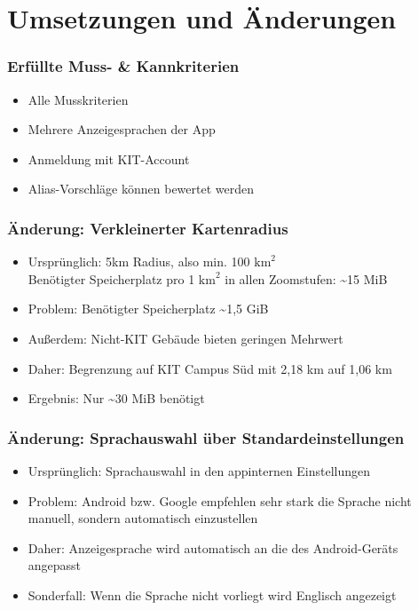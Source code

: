 \section{Umsetzungen und Änderungen}

\begin{frame}\frametitle{Erfüllte Muss- \& Kannkriterien}
    \begin{itemize}
        \item Alle Musskriterien
        \item Mehrere Anzeigesprachen der App
        \item Anmeldung mit KIT-Account
        \item Alias-Vorschläge können bewertet werden
    \end{itemize}
\end{frame}

\begin{frame}\frametitle{Änderung: Verkleinerter Kartenradius}
    \begin{itemize}
        \item Ursprünglich: 5km Radius, also min. 100 $\text{km}^2$ \\
            Benötigter Speicherplatz pro 1 $\text{km}^2$  in allen Zoomstufen: \textasciitilde15 MiB
        \item Problem: Benötigter Speicherplatz \textasciitilde1,5 GiB
        \item Außerdem: Nicht-KIT Gebäude bieten geringen Mehrwert
        \item Daher: Begrenzung auf KIT Campus Süd mit 2,18 km auf 1,06 km
        \item Ergebnis: Nur \textasciitilde30 MiB benötigt
    \end{itemize}
\end{frame}

\begin{frame}\frametitle{Verwendete Karte}
    \begin{center}
    \texttt{[image: \\relimgfile\{Karte]}}
    \end{center}
\end{frame}

\begin{frame}\frametitle{Änderung: Sprachauswahl über Standardeinstellungen}
    \begin{itemize}
        \item Ursprünglich: Sprachauswahl in den appinternen Einstellungen
        \item Problem: Android bzw. Google empfehlen sehr stark die Sprache nicht manuell, 
            sondern automatisch einzustellen
        \item Daher: Anzeigesprache wird automatisch an die des Android-Geräts angepasst
        \item Sonderfall: Wenn die Sprache nicht vorliegt wird Englisch angezeigt
    \end{itemize}
\end{frame}